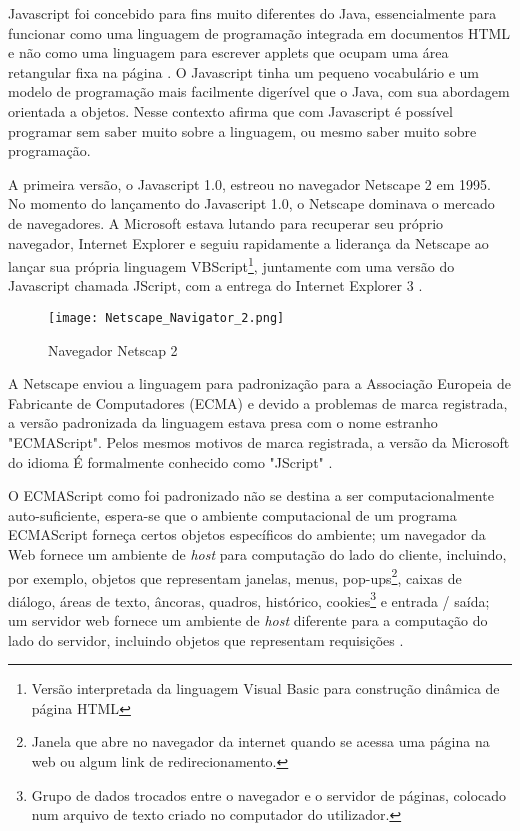 Javascript foi concebido para fins muito diferentes do Java, essencialmente para funcionar como uma linguagem de programação integrada em documentos HTML e não como uma linguagem para escrever applets que ocupam uma área retangular fixa na página \cite{goodman2007javascript}. O Javascript tinha um pequeno vocabulário e um modelo de programação mais facilmente digerível que o Java, com sua abordagem orientada a objetos. Nesse contexto  afirma que com Javascript é possível programar sem saber muito sobre a linguagem, ou mesmo saber muito sobre programação.

A primeira versão, o Javascript 1.0, estreou no navegador Netscape 2 em 1995. No momento do lançamento do Javascript 1.0, o Netscape dominava o mercado de navegadores. A Microsoft estava lutando para recuperar seu próprio navegador, Internet Explorer e seguiu rapidamente a liderança da Netscape ao lançar sua própria linguagem VBScript\footnote{Versão interpretada da linguagem Visual Basic para construção dinâmica de página HTML}, juntamente com uma versão do Javascript chamada JScript, com a entrega do Internet Explorer 3 \cite{keith2010dom}.

\begin{figure}[!htb]
	\centering
	\texttt{[image: Netscape\_Navigator\_2.png]}
	\caption{Navegador Netscap 2}
	\label{Netscape}
\end{figure}

A Netscape enviou a linguagem para padronização para a Associação Europeia de Fabricante de Computadores (ECMA) e devido a problemas de marca registrada, a versão padronizada da linguagem estava presa com o nome estranho "ECMAScript". Pelos mesmos motivos de marca registrada, a versão da Microsoft do idioma É formalmente conhecido como "JScript" \cite{flanagan2011javascript}.

O ECMAScript como foi padronizado não se destina a ser computacionalmente auto-suficiente, espera-se que o ambiente computacional de um programa ECMAScript forneça certos objetos específicos do ambiente; um navegador da Web fornece um ambiente de \textit{host} para computação do lado do cliente, incluindo, por exemplo, objetos que representam janelas, menus, pop-ups\footnote{Janela que abre no navegador da internet quando se acessa uma página na web ou algum link de redirecionamento.}, caixas de diálogo, áreas de texto, âncoras, quadros, histórico, cookies\footnote{Grupo de dados trocados entre o navegador e o servidor de páginas, colocado num arquivo de texto criado no computador do utilizador.} e entrada / saída; um servidor web fornece um ambiente de \textit{host} diferente para a computação do lado do servidor, incluindo objetos que representam requisições \cite{ecmascript2016}.

